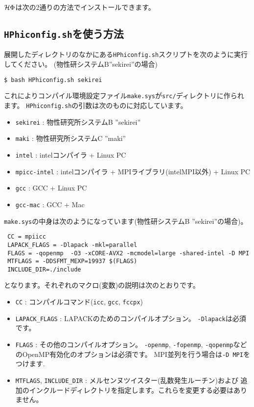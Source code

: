 $\mathcal{H} \Phi$は次の2通りの方法でインストールできます。

\subsection{\texttt{HPhiconfig.sh}を使う方法}

展開したディレクトリのなかにある\verb|HPhiconfig.sh|スクリプトを次のように実行してください。
(物性研システムB''sekirei''の場合)
\begin{verbatim}
$ bash HPhiconfig.sh sekirei
\end{verbatim}
これによりコンパイル環境設定ファイル\verb|make.sys|が\verb|src/|ディレクトリに作られます。
\verb|HPhiconfig.sh|の引数は次のものに対応しています。
\begin{itemize}
\item \verb|sekirei| : 物性研究所システムB ''sekirei''
\item \verb|maki| : 物性研究所システムC ''maki''
\item \verb|intel| : intelコンパイラ + Linux PC
\item \verb|mpicc-intel| : intelコンパイラ + MPIライブラリ(intelMPI以外) + Linux PC
\item \verb|gcc| : GCC + Linux PC
\item \verb|gcc-mac| : GCC + Mac
\end{itemize}

\verb|make.sys|の中身は次のようになっています(物性研システムB ''sekirei''の場合)。
\begin{verbatim}
 CC = mpiicc
 LAPACK_FLAGS = -Dlapack -mkl=parallel 
 FLAGS = -qopenmp  -O3 -xCORE-AVX2 -mcmodel=large -shared-intel -D MPI
 MTFLAGS = -DDSFMT_MEXP=19937 $(FLAGS)
 INCLUDE_DIR=./include
\end{verbatim}
となります。それぞれのマクロ(変数)の説明は次のとおりです。
\begin{itemize}
\item \verb|CC| : コンパイルコマンド(\verb|icc|, \verb|gcc|, \verb|fccpx|)
\item \verb|LAPACK_FLAGS| : LAPACKのためのコンパイルオプション。 \verb|-Dlapack|は必須です。
\item \verb|FLAGS| : その他のコンパイルオプション。
  \verb|-openmp|, \verb|-fopenmp|, \verb|-qopenmp|などのOpenMP有効化のオプションは必須です。
  MPI並列を行う場合は\verb|-D MPI|をつけます. 
\item \verb|MTFLAGS|, \verb|INCLUDE_DIR| : メルセンヌツイスター(乱数発生ルーチン)および
  追加のインクルードディレクトリを指定します。これらを変更する必要はありません。
\end{itemize}

